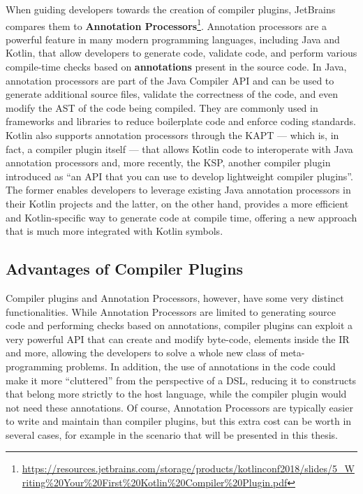 \documentclass[12pt,a4paper,openright,twoside]{book}
\begin{document}
When guiding developers towards the creation of compiler plugins, JetBrains
compares them to \textbf{Annotation
Processors}\footnote{\url{https://resources.jetbrains.com/storage/products/kotlinconf2018/slides/5_Writing\%20Your\%20First\%20Kotlin\%20Compiler\%20Plugin.pdf}}.
Annotation processors are a powerful feature in many modern programming
languages, including Java and Kotlin, that allow developers to generate code,
validate code, and perform various compile-time checks based on
\textbf{annotations} present in the source code.
%
In Java, annotation processors are part of the Java Compiler API and can be used
to generate additional source files, validate the correctness of the code, and
even modify the \ac{AST} of the code being compiled. They are
commonly used in frameworks and libraries to reduce boilerplate code and enforce
coding standards.
%
Kotlin also supports annotation processors through the \ac{KAPT} --- which is, in
fact, a compiler plugin itself --- that allows Kotlin code to interoperate with
Java annotation processors and, more recently, the \ac{KSP}, another compiler
plugin introduced as ``an API that you can use to develop lightweight compiler
plugins''. The former enables developers to leverage existing Java annotation
processors in their Kotlin projects and the latter, on the other hand, provides
a more efficient and Kotlin-specific way to generate code at compile time,
offering a new approach that is much more integrated with Kotlin symbols.

\subsection{Advantages of Compiler Plugins}

Compiler plugins and Annotation Processors, however, have some very distinct
functionalities. While Annotation Processors are limited to generating source
code and performing checks based on annotations, compiler plugins can exploit a
very powerful API that can create and modify byte-code, elements inside the
\ac{IR} and more, allowing the developers to solve a whole new class of
meta-programming problems. In addition, the use of annotations in the code could
make it more ``cluttered'' from the perspective of a \ac{DSL}, reducing it to
constructs that belong more strictly to the host language, while the compiler
plugin would not need these annotations. Of course, Annotation Processors are
typically easier to write and maintain than compiler plugins, but this extra
cost can be worth in several cases, for example in the scenario that will be
presented in this thesis.
\end{document}

